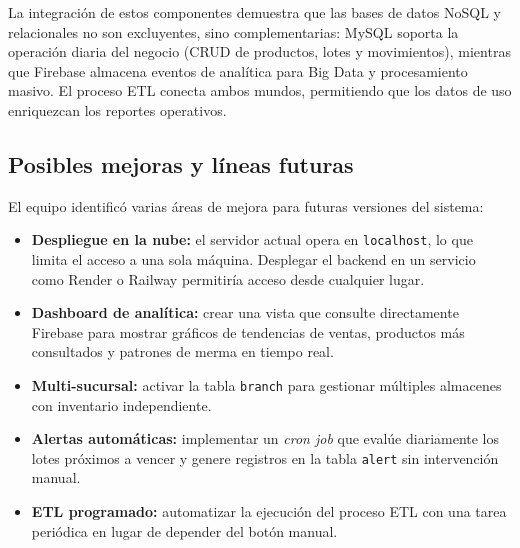 \documentclass[journal]{IEEEtran}
\begin{document}
	La integraci\'{o}n de estos componentes demuestra que las
	bases de datos NoSQL y relacionales no son excluyentes, sino
	complementarias: MySQL soporta la operaci\'{o}n diaria del
	negocio (CRUD de productos, lotes y movimientos), mientras
	que Firebase almacena eventos de anal\'{i}tica para Big Data
	y procesamiento masivo. El proceso ETL conecta ambos mundos,
	permitiendo que los datos de uso enriquezcan los reportes
	operativos.
	
	\subsection{Posibles mejoras y l\'{i}neas futuras}
	\label{subsec:futuro}
	
	El equipo identific\'{o} varias \'{a}reas de mejora para
	futuras versiones del sistema:
	
	\begin{itemize}[leftmargin=*, label=\textbullet, itemsep=2pt]
		\item \textbf{Despliegue en la nube:} el servidor actual
		opera en \texttt{localhost}, lo que limita el acceso a
		una sola m\'{a}quina. Desplegar el backend en un servicio
		como Render o Railway permitir\'{i}a acceso desde
		cualquier lugar.
		
		\item \textbf{Dashboard de anal\'{i}tica:} crear una vista
		que consulte directamente Firebase para mostrar gr\'{a}ficos
		de tendencias de ventas, productos m\'{a}s consultados y
		patrones de merma en tiempo real.
		
		\item \textbf{Multi-sucursal:} activar la tabla
		\texttt{branch} para gestionar m\'{u}ltiples
		almacenes con inventario independiente.
		
		\item \textbf{Alertas autom\'{a}ticas:} implementar un
		\textit{cron job} que eval\'{u}e diariamente los lotes
		pr\'{o}ximos a vencer y genere registros en la tabla
		\texttt{alert} sin intervenci\'{o}n manual.
		
		\item \textbf{ETL programado:} automatizar la ejecuci\'{o}n
		del proceso ETL con una tarea peri\'{o}dica en lugar de
		depender del bot\'{o}n manual.
	\end{itemize}
	
	
	\appendices
	
\end{document}
